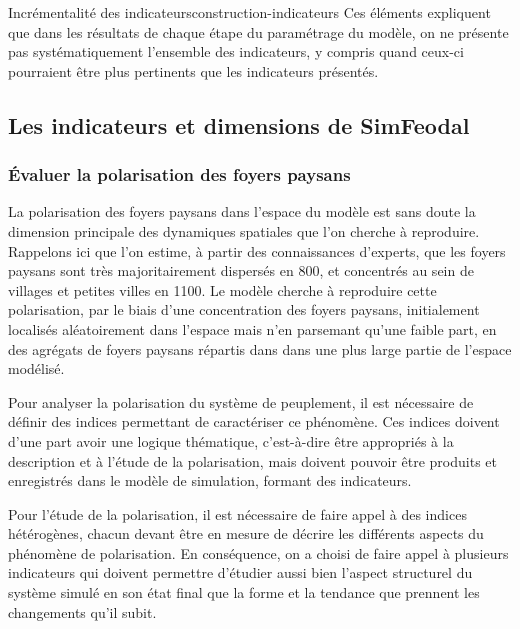 \begin{encadre}{Incrémentalité des indicateurs}{construction-indicateurs}
	Ces éléments expliquent que dans les résultats de chaque étape du paramétrage du modèle, on ne présente pas systématiquement l'ensemble des indicateurs, y compris quand ceux-ci pourraient être plus pertinents que les indicateurs présentés.
\end{encadre}


\pagebreak

\subsection{Les indicateurs et dimensions de SimFeodal}

\subsubsection{Évaluer la polarisation des foyers paysans \label{subsub:polarisation}}

La polarisation des foyers paysans dans l'espace du modèle est sans doute la dimension principale des dynamiques spatiales que l'on cherche à reproduire.
Rappelons ici que l'on estime, à partir des connaissances d'experts, que les foyers paysans sont très majoritairement dispersés en 800, et concentrés au sein de villages et petites villes en 1100.
Le modèle cherche à reproduire cette polarisation, par le biais d'une concentration des foyers paysans, initialement localisés aléatoirement dans l'espace mais n'en parsemant qu'une faible part, en des agrégats de foyers paysans répartis dans dans une plus large partie de l'espace modélisé.

Pour analyser la polarisation du système de peuplement, il est nécessaire de définir des indices permettant de caractériser ce phénomène.
Ces indices doivent d'une part avoir une logique thématique, c'est-à-dire être appropriés à la description et à l'étude de la polarisation, mais doivent  pouvoir être produits et enregistrés dans le modèle de simulation, formant des indicateurs.

Pour l'étude de la polarisation, il est nécessaire de faire appel à des indices hétérogènes, chacun devant être en mesure de décrire les différents aspects du phénomène de polarisation.
En conséquence, on a choisi de faire appel à plusieurs indicateurs qui doivent permettre d'étudier aussi bien l'aspect structurel du système simulé en son état final que la forme et la tendance que prennent les changements qu'il subit.

